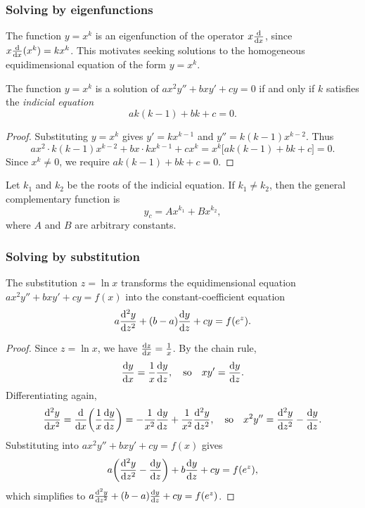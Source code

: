 \documentclass[a4paper]{article}
\begin{document}
\subsubsection{Solving by eigenfunctions}
\begin{remark}
  The function $y = x^k$ is an eigenfunction of the operator $x\frac{\mathrm{d}}{\mathrm{d} x}$, since $x\frac{\mathrm{d}}{\mathrm{d} x}(x^k) = kx^k$. This motivates seeking solutions to the homogeneous equidimensional equation of the form $y = x^k$.
\end{remark}

\begin{prop}
  The function $y = x^k$ is a solution of $ax^2y'' + bxy' + cy = 0$ if and only if $k$ satisfies the \emph{indicial equation}
  \[
    ak(k - 1) + bk + c = 0.
  \]
\end{prop}
\begin{proof}
  Substituting $y = x^k$ gives $y' = kx^{k - 1}$ and $y'' = k(k - 1)x^{k - 2}$. Thus
  \[
    ax^2 \cdot k(k - 1)x^{k - 2} + bx \cdot kx^{k - 1} + cx^k = x^k\bigl[ak(k - 1) + bk + c\bigr] = 0.
  \]
  Since $x^k \neq 0$, we require $ak(k - 1) + bk + c = 0$.
\end{proof}

\begin{prop}
  Let $k_1$ and $k_2$ be the roots of the indicial equation. If $k_1 \neq k_2$, then the general complementary function is
  \[
    y_c = Ax^{k_1} + Bx^{k_2},
  \]
  where $A$ and $B$ are arbitrary constants.
\end{prop}

\subsubsection{Solving by substitution}
\begin{prop}
  The substitution $z = \ln x$ transforms the equidimensional equation $ax^2y'' + bxy' + cy = f(x)$ into the constant-coefficient equation
  \[
    a\frac{\mathrm{d} ^2 y}{\mathrm{d} z^2} + (b - a)\frac{\mathrm{d} y}{\mathrm{d} z} + cy = f(e^z).
  \]
\end{prop}
\begin{proof}
  Since $z = \ln x$, we have $\frac{\mathrm{d} z}{\mathrm{d} x} = \frac{1}{x}$. By the chain rule,
  \[
    \frac{\mathrm{d} y}{\mathrm{d} x} = \frac{1}{x}\frac{\mathrm{d} y}{\mathrm{d} z}, \quad\text{so}\quad xy' = \frac{\mathrm{d} y}{\mathrm{d} z}.
  \]
  Differentiating again,
  \[
    \frac{\mathrm{d}^2 y}{\mathrm{d} x^2} = \frac{\mathrm{d}}{\mathrm{d} x}\!\left(\frac{1}{x}\frac{\mathrm{d} y}{\mathrm{d} z}\right) = -\frac{1}{x^2}\frac{\mathrm{d} y}{\mathrm{d} z} + \frac{1}{x^2}\frac{\mathrm{d}^2 y}{\mathrm{d} z^2}, \quad\text{so}\quad x^2y'' = \frac{\mathrm{d}^2 y}{\mathrm{d} z^2} - \frac{\mathrm{d} y}{\mathrm{d} z}.
  \]
  Substituting into $ax^2y'' + bxy' + cy = f(x)$ gives
  \[
    a\!\left(\frac{\mathrm{d}^2 y}{\mathrm{d} z^2} - \frac{\mathrm{d} y}{\mathrm{d} z}\right) + b\frac{\mathrm{d} y}{\mathrm{d} z} + cy = f(e^z),
  \]
  which simplifies to $a\frac{\mathrm{d}^2 y}{\mathrm{d} z^2} + (b - a)\frac{\mathrm{d} y}{\mathrm{d} z} + cy = f(e^z)$.
\end{proof}
\end{document}

